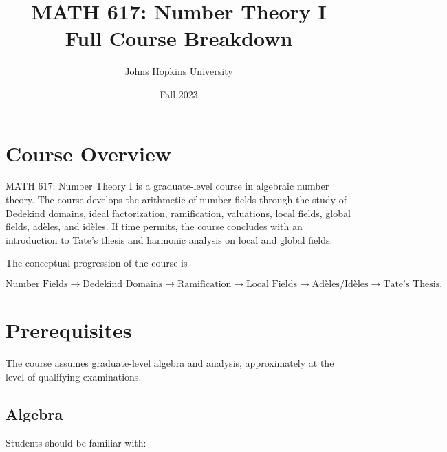 \documentclass[11pt]{article}
\title{\textbf{MATH 617: Number Theory I}\\
Full Course Breakdown}
\author{Johns Hopkins University}
\date{Fall 2023}
\begin{document}
\maketitle

\tableofcontents
\newpage

\section{Course Overview}

MATH 617: Number Theory I is a graduate-level course in algebraic
number theory. The course develops the arithmetic of number fields
through the study of Dedekind domains, ideal factorization,
ramification, valuations, local fields, global fields, adèles,
and idèles. If time permits, the course concludes with an
introduction to Tate's thesis and harmonic analysis on local and
global fields.

The conceptual progression of the course is

\[
\boxed{
\text{Number Fields}
\longrightarrow
\text{Dedekind Domains}
\longrightarrow
\text{Ramification}
\longrightarrow
\text{Local Fields}
\longrightarrow
\text{Adèles/Idèles}
\longrightarrow
\text{Tate's Thesis}.
}
\]

\section{Prerequisites}

The course assumes graduate-level algebra and analysis,
approximately at the level of qualifying examinations.

\subsection{Algebra}

Students should be familiar with:
\end{document}
